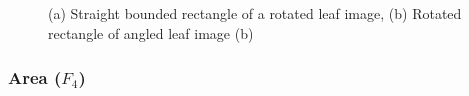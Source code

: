\documentclass{article}
\begin{document}
\begin{figure}[!ht]

{\centering {}

}

\caption{\label{bound} (a) Straight bounded rectangle of a rotated leaf image, (b) Rotated rectangle of angled leaf image (b)}\label{fig:bound}
\end{figure}


\hypertarget{area-f_4}{%
\subsubsection{\texorpdfstring{Area
(\(F_4\))}{Area (F\_4)}}\label{area-f_4}}
\end{document}
